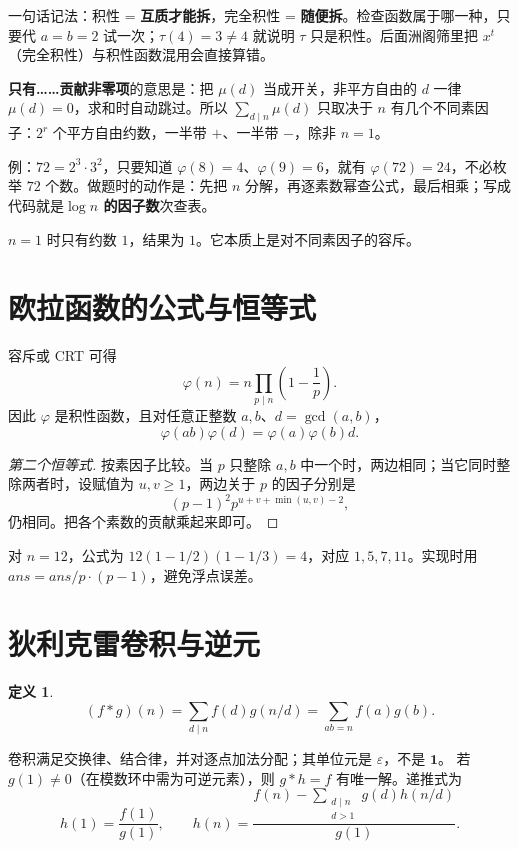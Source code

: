 \documentclass[UTF8,a4paper,11pt,twoside,openright,fontset=fandol]{ctexbook}
\theoremstyle{definition}
\newtheorem{definition}{定义}[chapter]
\newcommand{\eps}{\varepsilon}
\newcommand{\one}{\mathbf 1}
\begin{document}
\begin{tip}[词义：积性 / 完全积性]
一句话记法：积性 = \textbf{互质才能拆}，完全积性 = \textbf{随便拆}。检查函数属于哪一种，只要代 $a=b=2$ 试一次；$\tau(4)=3\ne4$ 就说明 $\tau$ 只是积性。后面洲阁筛里把 $x^t$（完全积性）与积性函数混用会直接算错。
\end{tip}

\begin{tip}[词义：把 $\mu(d)$ 当开关]
\textbf{只有……贡献非零项}的意思是：把 $\mu(d)$ 当成开关，非平方自由的 $d$ 一律 $\mu(d)=0$，求和时自动跳过。所以 $\sum_{d\mid n}\mu(d)$ 只取决于 $n$ 有几个不同素因子：$2^r$ 个平方自由约数，一半带 $+$、一半带 $-$，除非 $n=1$。
\end{tip}

\begin{tip}
例：$72=2^3\cdot3^2$，只要知道 $\varphi(8)=4$、$\varphi(9)=6$，就有 $\varphi(72)=24$，不必枚举 $72$ 个数。做题时的动作是：先把 $n$ 分解，再逐素数幂查公式，最后相乘；写成代码就是\textbf{$\log n$ 的因子数}次查表。
\end{tip}

$n=1$ 时只有约数 $1$，结果为 $1$。它本质上是对不同素因子的容斥。


\section{欧拉函数的公式与恒等式}
容斥或 CRT 可得
\[
 \varphi(n)=n\prod_{p\mid n}\left(1-\frac1p\right).
\]
因此 $\varphi$ 是积性函数，且对任意正整数 $a,b$、$d=\gcd(a,b)$，
\[
 \varphi(ab)\varphi(d)=\varphi(a)\varphi(b)d.
\]

\begin{proof}[第二个恒等式]
按素因子比较。当 $p$ 只整除 $a,b$ 中一个时，两边相同；当它同时整除两者时，设赋值为 $u,v\ge1$，两边关于 $p$ 的因子分别是
\[
 (p-1)^2p^{u+v+\min(u,v)-2},
\]
仍相同。把各个素数的贡献乘起来即可。
\end{proof}
对 $n=12$，公式为 $12(1-1/2)(1-1/3)=4$，对应 $1,5,7,11$。实现时用 $ans=ans/p\cdot(p-1)$，避免浮点误差。


\section{狄利克雷卷积与逆元}
\begin{definition}
\[
 (f*g)(n)=\sum_{d\mid n}f(d)g(n/d)=\sum_{ab=n}f(a)g(b).
\]
\end{definition}
卷积满足交换律、结合律，并对逐点加法分配；其单位元是 $\eps$，不是 $\one$。
若 $g(1)\ne0$（在模数环中需为可逆元素），则 $g*h=f$ 有唯一解。递推式为
\[
 h(1)=\frac{f(1)}{g(1)},\qquad
 h(n)=\frac{f(n)-\sum_{\substack{d\mid n\\d>1}}g(d)h(n/d)}{g(1)}.
\]
\end{document}
